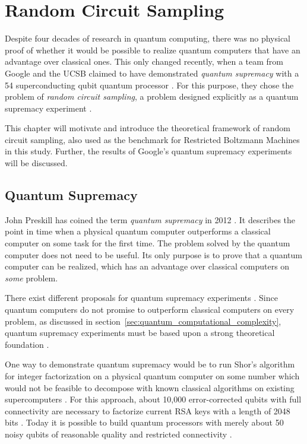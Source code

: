 \chapter{Random Circuit Sampling}
\label{sec:rcs}

Despite four decades
of research in quantum computing, 
there was no physical proof of whether it would be possible to realize quantum computers
that have an advantage over classical ones. This only changed
recently, when a team from Google and the UCSB claimed to have demonstrated \textit{quantum supremacy}
with a 54 superconducting qubit quantum processor \cite{martines2019supremacy}. For this purpose, they
chose the problem of \textit{random circuit sampling}, a problem designed explicitly
as a quantum supremacy experiment \cite{Boixo2018supremacy}.

This chapter will motivate and introduce the theoretical framework of random circuit
sampling, also used as the benchmark for Restricted Boltzmann Machines in this
study. Further, the results of Google's quantum supremacy experiments will be discussed.

\section{Quantum Supremacy}
\label{sec:quantum_supremacy}

John Preskill has coined the term \textit{quantum supremacy} in 2012
\cite{preskill2012quantum}. It describes the point in time when a physical quantum computer
outperforms a classical computer on some task for the first time. The problem
solved by the quantum computer does not need to be useful. Its only purpose is
to prove that a quantum computer can be realized, which has an advantage over
classical computers on \textit{some} problem.

There exist different proposals for quantum supremacy
experiments \cite{shor1997factorisation, aaronson2013boson, Boixo2018supremacy}. Since quantum computers do not promise to outperform classical
computers on every problem, as discussed in section~\ref{sec:quantum_computational_complexity}, 
quantum supremacy experiments must be based upon a strong theoretical foundation \cite{Bernstein93quantumcomplexity}.

One way to demonstrate quantum supremacy would be to run Shor's
algorithm for integer factorization \cite{shor1997factorisation} on a physical quantum computer on some number which would not be feasible
to decompose with known classical algorithms on existing supercomputers \cite{martinlopez2011experimental}. 
For this approach, about 10,000 error-corrected qubits with full connectivity are necessary to factorize current 
RSA keys with a length of 2048 bits \cite{Barker15nistspecial,shor1997factorisation}. Today it is possible to
build quantum processors with merely about 50 noisy qubits of reasonable quality and restricted connectivity \cite{martines2019supremacy}.

